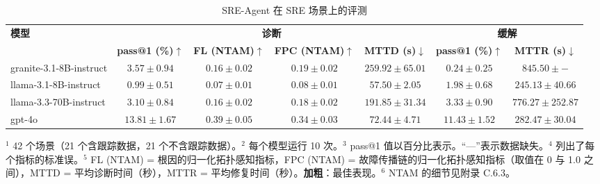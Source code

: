 \documentclass[10pt,UTF8,fontset=fandol]{ctexart}
\begin{document}
\begin{table}[H]
\centering
\caption{SRE-Agent 在 SRE 场景上的评测}
\label{tab:itb-sre}
\begin{adjustbox}{max width=\linewidth}
\begin{tabular}{lcccc cc}
\toprule
\multirow{2}{*}{\textbf{模型}} & \multicolumn{4}{c}{\textbf{诊断}} & \multicolumn{2}{c}{\textbf{缓解}} \\
\cmidrule(lr){2-5} \cmidrule(lr){6-7}
 & \textbf{pass@1 (\%)}$\uparrow$ & \textbf{FL (NTAM)}$\uparrow$ & \textbf{FPC (NTAM)}$\uparrow$ & \textbf{MTTD (s)}$\downarrow$ & \textbf{pass@1 (\%)}$\uparrow$ & \textbf{MTTR (s)}$\downarrow$ \\
\midrule
granite-3.1-8B-instruct & $3.57 \pm 0.94$ & $0.16 \pm 0.02$ & $0.19 \pm 0.02$ & $259.92 \pm 65.01$ & $0.24 \pm 0.25$ & $845.50 \pm {-}$ \\
llama-3.1-8B-instruct & $0.99 \pm 0.51$ & $0.07 \pm 0.01$ & $0.08 \pm 0.01$ & $57.50 \pm 2.05$ & $1.98 \pm 0.68$ & $245.13 \pm 40.66$ \\
llama-3.3-70B-instruct & $3.10 \pm 0.84$ & $0.16 \pm 0.02$ & $0.18 \pm 0.02$ & $191.85 \pm 31.34$ & $3.33 \pm 0.90$ & $776.27 \pm 252.87$ \\
gpt-4o & $\mathbf{13.81 \pm 1.67}$ & $\mathbf{0.39 \pm 0.05}$ & $\mathbf{0.34 \pm 0.03}$ & $72.44 \pm 4.71$ & $\mathbf{11.43 \pm 1.52}$ & $282.47 \pm 30.04$ \\
\bottomrule
\end{tabular}
\end{adjustbox}

{\footnotesize
\noindent $^1$ 42 个场景（21 个含跟踪数据，21 个不含跟踪数据）。\quad $^2$ 每个模型运行 10 次。\quad $^3$ pass@1 值以百分比表示。\quad “{---}”表示数据缺失。\quad $^4$ 列出了每个指标的标准误。\quad $^5$ FL (NTAM) = 根因的归一化拓扑感知指标，FPC (NTAM) = 故障传播链的归一化拓扑感知指标（取值在 0 与 1.0 之间），MTTD = 平均诊断时间（秒），MTTR = 平均修复时间（秒）。\textbf{加粗}：最佳表现。\quad $^6$ NTAM 的细节见附录 C.6.3。
\par}
\end{table}
\end{document}
